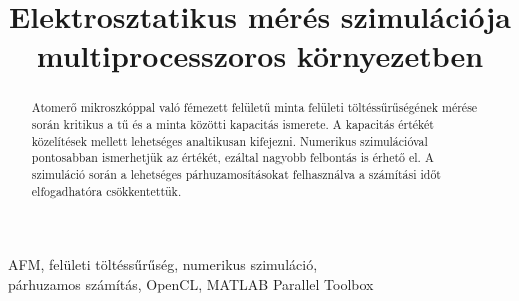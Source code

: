 \documentclass[9pt,conference, a4paper]{IEEEtran}
\begin{document}
	\title{Elektrosztatikus mérés szimulációja multiprocesszoros környezetben}
	
	\author{
		 
		\and
		 
	}
	
	\maketitle

	\begin{abstract}
	 Atomerő mikroszkóppal való fémezett felületű minta felületi töltéssűrűségének mérése során
	 kritikus a tű és a minta közötti kapacitás ismerete.
	 A kapacitás értékét közelítések mellett lehetséges analtikusan kifejezni.
	 Numerikus szimulációval pontosabban ismerhetjük az értékét, ezáltal nagyobb felbontás is érhető
	 el.
	 A szimuláció során a lehetséges párhuzamosításokat felhasználva a számítási időt elfogadhatóra
	 csökkentettük.
	\end{abstract}

	\begin{IEEEkeywords}
	 AFM, felületi töltéssűrűség, numerikus szimuláció, \\ párhuzamos számítás, OpenCL, MATLAB Parallel
	 Toolbox
	\end{IEEEkeywords}

	
	
	
	
	
	
	
	
	
	
	
	
	
	
	
\end{document}

